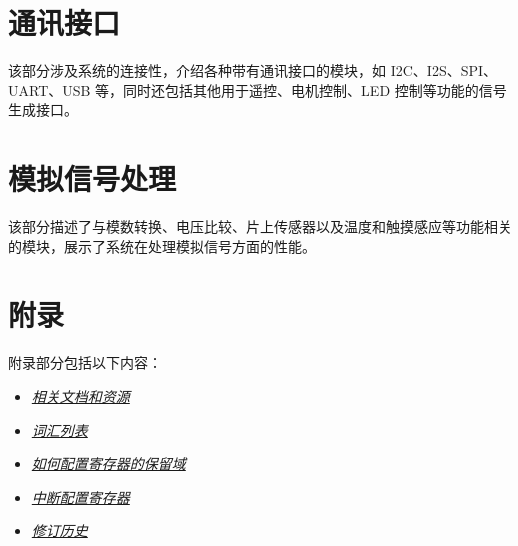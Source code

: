 \documentclass[openany, 10pt]{book}
\begin{document}

\part{通讯接口}


该部分涉及系统的连接性，介绍各种带有通讯接口的模块，如 I2C、I2S、SPI、UART、USB 等，同时还包括其他用于遥控、电机控制、LED 控制等功能的信号生成接口。


\part{模拟信号处理}


该部分描述了与模数转换、电压比较、片上传感器以及温度和触摸感应等功能相关的模块，展示了系统在处理模拟信号方面的性能。



\part{附录}\label{appendix}

附录部分包括以下内容：

\begin{itemize}
    \item \hyperref[sec:resources]{\textit{相关文档和资源}}
    \item \hyperref[glossary]{\textit{词汇列表}}
    \item \hyperref[programming-reserved-field]{\textit{如何配置寄存器的保留域}}
    \item \hyperref[interrupt-config-registers]{\textit{中断配置寄存器}}
    \item \hyperref[revision-history]{\textit{修订历史}}
\end{itemize}
\end{document}
